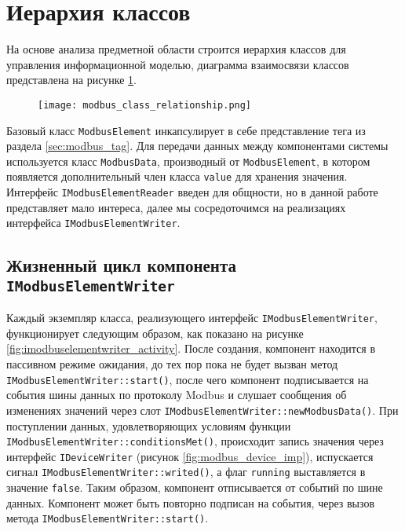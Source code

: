 \section{Иерархия классов}
На основе анализа предметной области строится иерархия классов для управления информационной моделью,
диаграмма взаимосвязи классов представлена на рисунке \ref{fig:modbus_class_uml}. 
\begin{landscape}
    \begin{center}
        \begin{figure}[h!]
            \texttt{[image: modbus\_class\_relationship.png]}
            \caption{}\label{fig:modbus_class_uml}
        \end{figure}
    \end{center}
\end{landscape}
Базовый класс \texttt{ModbusElement} инкапсулирует в себе представление тега из раздела \ref{sec:modbus_tag}.
Для передачи данных между компонентами системы используется класс \texttt{ModbusData}, производный от \texttt{ModbusElement},
в котором появляется дополнительный член класса \texttt{value} для хранения значения.
Интерфейс \texttt{IModbusElementReader} введен для общности, но в данной работе представляет мало интереса, далее мы сосредоточимся 
на реализациях интерфейса \texttt{IModbusElementWriter}.



\subsection{Жизненный цикл компонента \texttt{IModbusElementWriter}}
Каждый экземпляр класса, реализующего интерфейс \texttt{IModbusElementWriter},
функционирует следующим образом, как показано на рисунке \ref{fig:imodbuselementwriter_activity}.
После создания, компонент находится в пассивном режиме ожидания, до тех пор пока не будет вызван
метод \texttt{IModbusElementWriter::start()}, после чего компонент подписывается на события шины данных по протоколу Modbus
и слушает сообщения об изменениях значений через слот \texttt{IModbusElementWriter::newModbusData()}.
При поступлении данных, удовлетворяющих условиям функции \texttt{IModbusElementWriter::conditionsMet()},
происходит запись значения через интерфейс \texttt{IDeviceWriter} (рисунок \ref{fig:modbus_device_imp}),
испускается сигнал \texttt{IModbusElementWriter::writed()},
а флаг \texttt{running} выставляется в значение \texttt{false}.
Таким образом, компонент отписывается от событий по шине данных.
Компонент может быть повторно подписан на события, через вызов метода \texttt{IModbusElementWriter::start()}.

